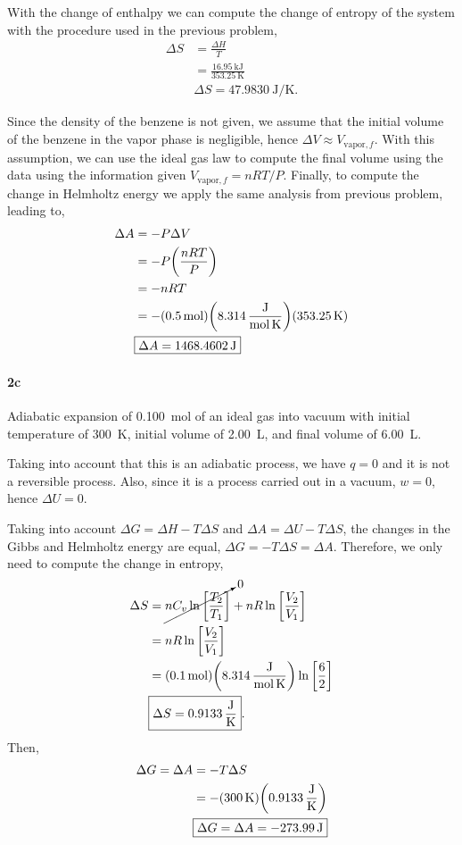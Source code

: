 \documentclass[main.tex]{subfiles}
\begin{document}
With the change of enthalpy we can compute the change of entropy of the system with the procedure used in the previous problem,
\begin{align*}
    \Delta S &= \frac{\Delta H}{T} \\
    &= \frac{\SI{16.95}{\kilo\joule}}{\SI{353.25}{\kelvin}} \\
    &\boxed{\Delta S =\SI[per-mode=fraction]{47.9830}{\joule\per\kelvin}.}
\end{align*}

Since the density of the benzene is not given, we assume that the initial volume of the benzene in the vapor phase is negligible, hence $\Delta V \approx V_{\mathrm{vapor},f}$.
With this assumption, we can use the ideal gas law to compute the final volume using the data using the information given $V_{\mathrm{vapor},f} = nRT/P$.
Finally, to compute the change in Helmholtz energy we apply the same analysis from previous problem, leading to,
\begin{align*}
    \Delta A &= -P\Delta V \\
    &= -P\qty(\frac{nRT}{P}) \\
    &= -nRT \\
    &= -\qty(\SI{0.5}{\mole})\qty(\SI[per-mode=fraction]{8.314}{\joule\per\mole\per\kelvin})\qty(\SI{353.25}{\kelvin}) \\
    &\boxed{\Delta A =\SI{1468.4602}{\joule}}
\end{align*}

\paragraph{2c} Adiabatic expansion of \SI{0.100}{\mole} of an ideal gas into vacuum with initial temperature of \SI{300}{\kelvin}, initial volume of \SI{2.00}{\liter}, and final volume of \SI{6.00}{\liter}.

Taking into account that this is an adiabatic process, we have $q=0$ and it is not a reversible process.
Also, since it is a process carried out in a vacuum, $w=0$, hence $\Delta U = 0$.

Taking into account $\Delta G =\Delta H -T\Delta S$ and $\Delta A=\Delta U - T\Delta S$, the changes in the Gibbs and Helmholtz energy are equal, $\Delta G = -T\Delta S = \Delta A$.
Therefore, we only need to compute the change in entropy,
\begin{align*}
    \Delta S &= \cancelto{0}{nC_v\ln\qty[\frac{T_2}{T_1}]} + nR\ln\qty[\frac{V_2}{V_1}] \\
    &= nR\ln\qty[\frac{V_2}{V_1}] \\
    &= \qty(\SI{0.1}{\mole})\qty(\SI[per-mode=fraction]{8.314}{\joule\per\mole\per\kelvin})\ln\qty[\frac{6}{2}] \\
    &\boxed{\Delta S=\SI[per-mode=fraction]{0.9133}{\joule\per\kelvin}}.
\end{align*}
Then,
\begin{align*}
    \Delta G = \Delta A &= -T\Delta S \\
    &= -\qty(\SI{300}{\kelvin})\qty(\SI[per-mode=fraction]{0.9133}{\joule\per\kelvin}) \\
    &\boxed{\Delta G = \Delta A = -\SI{273.99}{\joule}}
\end{align*}
\end{document}
